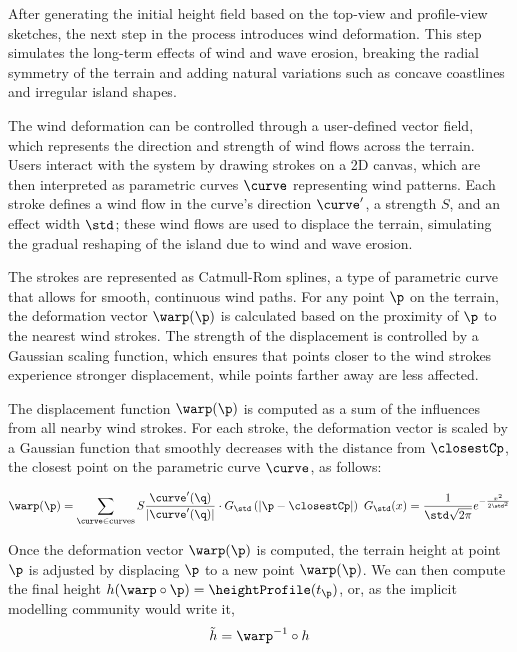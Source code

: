 After generating the initial height field based on the top-view and profile-view sketches, the next step in the process introduces wind deformation. This step simulates the long-term effects of wind and wave erosion, breaking the radial symmetry of the terrain and adding natural variations such as concave coastlines and irregular island shapes.

The wind deformation can be controlled through a user-defined vector field, which represents the direction and strength of wind flows across the terrain. Users interact with the system by drawing strokes on a 2D canvas, which are then interpreted as parametric curves $\curve$ representing wind patterns. Each stroke defines a wind flow in the curve's direction $\curve'$, a strength $S$, and an effect width $\std$; these wind flows are used to displace the terrain, simulating the gradual reshaping of the island due to wind and wave erosion.

The strokes are represented as Catmull-Rom splines, a type of parametric curve that allows for smooth, continuous wind paths. For any point $\p$ on the terrain, the deformation vector $\warp(\p)$ is calculated based on the proximity of $\p$ to the nearest wind strokes. The strength of the displacement is controlled by a Gaussian scaling function, which ensures that points closer to the wind strokes experience stronger displacement, while points farther away are less affected.

The displacement function $\warp(\p)$ is computed as a sum of the influences from all nearby wind strokes. For each stroke, the deformation vector is scaled by a Gaussian function that smoothly decreases with the distance from $\closestCp$, the closest point on the parametric curve $\curve$, as follows:

\begin{align}
\warp(\p) = \sum_{\curve \in \text{curves}} S \frac{\curve'(\q)}{| \curve'(\q) | } \cdot G_\std\left(| \p - \closestCp | \right) %
\
G_\std(x) = \frac{1}{\std \sqrt{2\pi}} e^{-\frac{x^2}{2 \std^2}}
\end{align}

Once the deformation vector $\warp(\p)$ is computed, the terrain height at point $\p$ is adjusted by displacing $\p$ to a new point $\warp(\p)$.
We can then compute the final height $h(\warp \circ \p) = \heightProfile(t_{\p})$, or, as the implicit modelling community would write it,
\begin{align}
\Tilde{h} = \warp^{-1} \circ h
\end{align}

